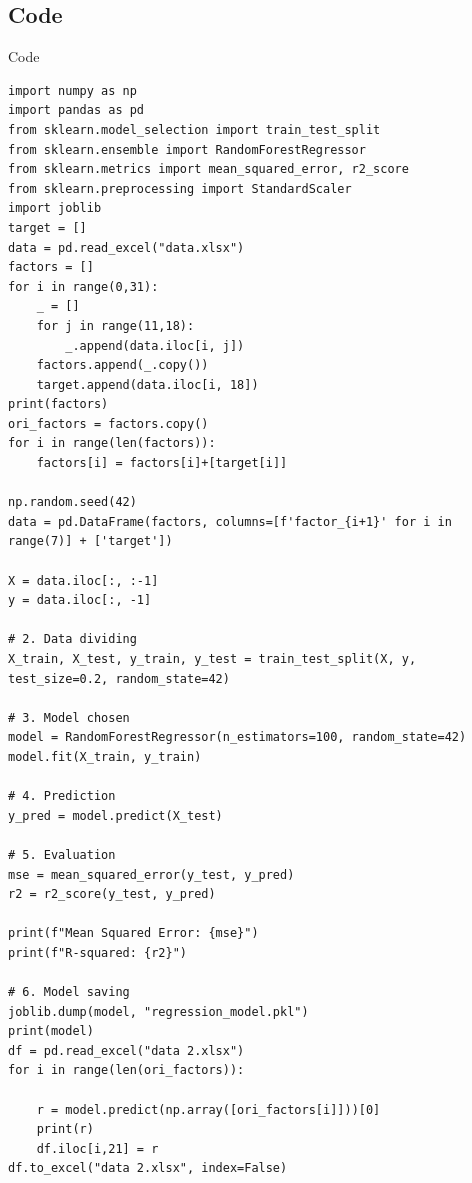 \documentclass[a4paper]{article}
\begin{document}
    \subsection{Code}
\begin{listing}[h]\caption{Code}
    \begin{verbatim}
import numpy as np
import pandas as pd
from sklearn.model_selection import train_test_split
from sklearn.ensemble import RandomForestRegressor
from sklearn.metrics import mean_squared_error, r2_score
from sklearn.preprocessing import StandardScaler
import joblib
target = []
data = pd.read_excel("data.xlsx")
factors = []
for i in range(0,31):
    _ = []
    for j in range(11,18):
        _.append(data.iloc[i, j])
    factors.append(_.copy())
    target.append(data.iloc[i, 18])
print(factors)
ori_factors = factors.copy()
for i in range(len(factors)):
    factors[i] = factors[i]+[target[i]]

np.random.seed(42)
data = pd.DataFrame(factors, columns=[f'factor_{i+1}' for i in range(7)] + ['target'])

X = data.iloc[:, :-1]  
y = data.iloc[:, -1]   

# 2. Data dividing
X_train, X_test, y_train, y_test = train_test_split(X, y, test_size=0.2, random_state=42)

# 3. Model chosen
model = RandomForestRegressor(n_estimators=100, random_state=42)
model.fit(X_train, y_train)

# 4. Prediction
y_pred = model.predict(X_test)

# 5. Evaluation
mse = mean_squared_error(y_test, y_pred)
r2 = r2_score(y_test, y_pred)

print(f"Mean Squared Error: {mse}")
print(f"R-squared: {r2}")

# 6. Model saving
joblib.dump(model, "regression_model.pkl")
print(model)
df = pd.read_excel("data 2.xlsx")
for i in range(len(ori_factors)):

    r = model.predict(np.array([ori_factors[i]]))[0]
    print(r)
    df.iloc[i,21] = r
df.to_excel("data 2.xlsx", index=False)
    \end{verbatim}
\end{listing}
\end{document}
